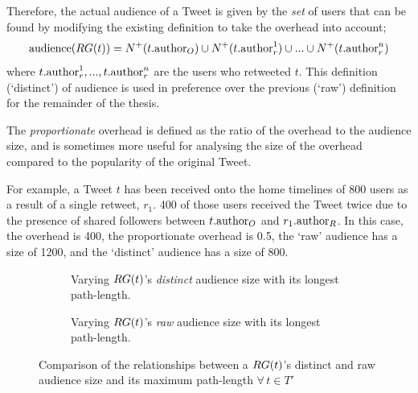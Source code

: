 Therefore, the actual audience of a Tweet is given by the \textit{set} of users that can be found by modifying the existing definition to take the overhead into account;
\[
	\textrm{audience}(RG(t)) = N^+(t.\textrm{author}_O) \cup N^+(t.\textrm{author}_r^1) \cup ... \cup N^+(t.\textrm{author}_r^n)
\]
where $t.\textrm{author}_r^1, ..., t.\textrm{author}_r^n$ are the users who retweeted $t$. This definition (`distinct') of audience is used in preference over the previous (`raw') definition for the remainder of the thesis.

 The \textit{proportionate} overhead is defined as the ratio of the overhead to the audience size, and is sometimes more useful for analysing the size of the overhead compared to the popularity of the original Tweet.

For example, a Tweet $t$ has been received onto the home timelines of 800 users as a result of a single retweet, $r_1$. 400 of those users received the Tweet twice due to the presence of shared followers between $t.\textrm{author}_O$ and $r_1.\textrm{author}_R$. In this case, the overhead is 400, the proportionate overhead is 0.5, the `raw'  audience has a size of 1200, and the `distinct' audience has a size of 800.

\begin{figure}[h]
\begin{subfigure}{.5\textwidth}
    \centering
    \caption{Varying $RG(t)$'s \textit{distinct} audience size with its longest path-length.}
    \label{fig:pathlength-audience}
\end{subfigure}
\quad
\begin{subfigure}{.5\textwidth}
    \centering
    \caption{Varying $RG(t)$'s \textit{raw} audience size with its longest path-length.}
    \label{fig:pathlength-rawaudience}
\end{subfigure}
\caption{Comparison of the relationships between a $RG(t)$'s distinct and raw audience size and its maximum path-length $\forall \, t \in T'$}
\end{figure}

